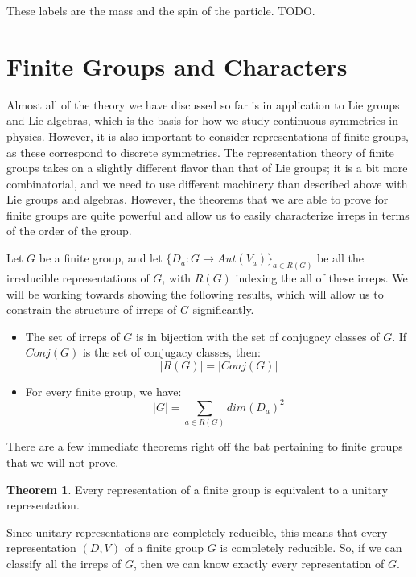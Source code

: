 \documentclass[11pt, oneside]{article}   	%
\theoremstyle{definition}
\newtheorem{theorem}{Theorem}[section]
\begin{document}
These labels are the mass and the spin of the particle. TODO.

\newpage
\section{Finite Groups and Characters}

Almost all of the theory we have discussed so far is in application to Lie groups and Lie algebras, which is the basis for how 
we study continuous symmetries in physics. However, it is also important to consider representations of finite groups, as 
these correspond to discrete symmetries. The representation theory of finite groups takes on a slightly different flavor than 
that of Lie groups; it is a bit more combinatorial, and we need to use different machinery than described above with Lie groups 
and algebras. However, the theorems that we are able to prove for finite groups are quite powerful and allow us to 
easily characterize irreps in terms of the order of the group. 

Let $G$ be a finite group, and let $\{D_a : G\rightarrow Aut(V_a)\}_{a\in R(G)}$ be all the irreducible representations of $G$, 
with $R(G)$ indexing the all of these irreps. We will be working towards showing the following results, which will allow us to 
constrain the structure of irreps of $G$ significantly.
 \begin{itemize}
 	\item The set of irreps of $G$ is in bijection with the set of conjugacy classes of $G$. If $Conj(G)$ is the set of conjugacy 
	classes, then:
	\begin{equation}
		|R(G)| = |Conj(G)|
	\end{equation}
	\item For every finite group, we have:
	\begin{equation}
		|G| = \sum_{a\in R(G)} dim(D_a)^2
	\end{equation}
 \end{itemize}

There are a few immediate theorems right off the bat pertaining to finite groups that we will not prove.
\begin{theorem}
	Every representation of a finite group is equivalent to a unitary representation.
\end{theorem}
Since unitary representations are completely reducible, this means that every representation $(D, V)$ of a finite group $G$ is 
completely reducible. So, if we can classify all the irreps of $G$, then we can know exactly every representation of $G$. 
\end{document}
